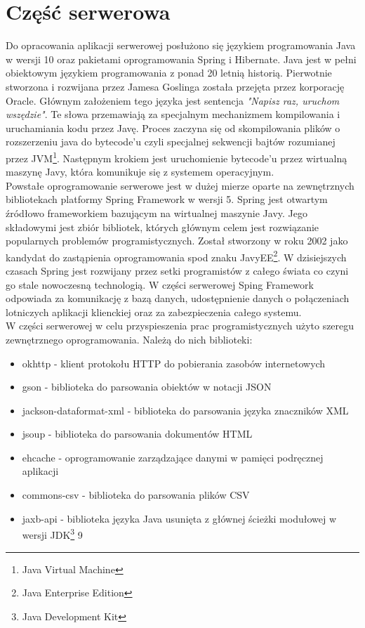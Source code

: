 \documentclass[12pt, twoside]{report}
\begin{document}
\section{Część serwerowa}
Do opracowania aplikacji serwerowej posłużono się językiem programowania Java w wersji 10 oraz pakietami oprogramowania Spring i Hibernate. Java jest w pełni obiektowym językiem programowania z ponad 20 letnią historią. Pierwotnie stworzona i rozwijana przez Jamesa Goslinga została przejęta przez korporację Oracle. Głównym założeniem tego języka jest sentencja \textit{"Napisz raz, uruchom wszędzie"}. Te słowa przemawiają za specjalnym mechanizmem kompilowania i uruchamiania kodu przez Javę. Proces zaczyna się od skompilowania plików o rozszerzeniu java do bytecode'u czyli specjalnej sekwencji bajtów rozumianej przez JVM\footnote{Java Virtual Machine}. Następnym krokiem jest uruchomienie bytecode'u przez wirtualną maszynę Javy, która komunikuje się z systemem operacyjnym\cite{jvm}. \\ \indent
Powstałe oprogramowanie serwerowe jest w dużej mierze oparte na zewnętrznych bibliotekach platformy Spring Framework w wersji 5. Spring jest otwartym źródłowo frameworkiem bazującym na wirtualnej maszynie Javy. Jego składowymi jest zbiór bibliotek, których głównym celem jest rozwiązanie popularnych problemów programistycznych. Został stworzony w roku 2002 jako kandydat do zastąpienia oprogramowania spod znaku JavyEE\footnote{Java Enterprise Edition}. W dzisiejszych czasach Spring jest rozwijany przez setki programistów z całego świata co czyni go stale nowoczesną technologią. W części serwerowej Sping Framework odpowiada za komunikację z bazą danych, udostępnienie danych o połączeniach lotniczych aplikacji klienckiej oraz za zabezpieczenia całego systemu. \\ \indent
W części serwerowej w celu przyspieszenia prac programistycznych użyto szeregu zewnętrznego oprogramowania. Należą do nich biblioteki:
\begin{itemize}[noitemsep,topsep=0pt]
\item okhttp - klient protokołu HTTP do pobierania zasobów internetowych
\item gson - biblioteka do parsowania obiektów w notacji JSON
\item jackson-dataformat-xml - biblioteka do parsowania języka znaczników XML
\item jsoup - biblioteka do parsowania dokumentów HTML
\item ehcache - oprogramowanie zarządzające danymi w pamięci podręcznej aplikacji
\item commons-csv - biblioteka do parsowania plików CSV
\item jaxb-api - biblioteka języka Java usunięta z głównej ścieżki modułowej w wersji JDK\footnote{Java Development Kit} 9  
\end{itemize}
\end{document}

